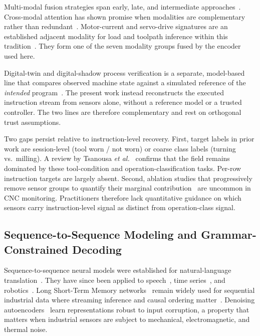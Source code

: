 \documentclass[sensors,article,submit,moreauthors,pdftex]{Definitions/mdpi}
\newcommand{\etal}{\textit{et al.}}
\begin{document}
Multi-modal fusion strategies span early, late, and intermediate approaches~\cite{lahat2015multimodal,ramachandram2017deep}. Cross-modal attention has shown promise when modalities are complementary rather than redundant~\cite{cao2023crossattention,wang2024multisensor}. Motor-current and servo-drive signatures are an established adjacent modality for load and toolpath inference within this tradition~\cite{teti2010advanced,wang2018deep}. They form one of the seven modality groups fused by the encoder used here.

Digital-twin and digital-shadow process verification is a separate, model-based line that compares observed machine state against a simulated reference of the \emph{intended} program~\cite{bergs2021digital}. The present work instead reconstructs the executed instruction stream from sensors alone, without a reference model or a trusted controller. The two lines are therefore complementary and rest on orthogonal trust assumptions.

Two gaps persist relative to instruction-level recovery. First, target labels in prior work are session-level (tool worn / not worn) or coarse class labels (turning vs.\ milling). A review by Tsanousa \etal~\cite{tsanousa2022multisensor} confirms that the field remains dominated by these tool-condition and operation-classification tasks. Per-row instruction targets are largely absent. Second, ablation studies that progressively remove sensor groups to quantify their marginal contribution~\cite{meyes2019ablation,jia2016deep} are uncommon in CNC monitoring. Practitioners therefore lack quantitative guidance on which sensors carry instruction-level signal as distinct from operation-class signal.

\subsection{Sequence-to-Sequence Modeling and Grammar-Constrained Decoding}
\label{sec:related-seq2seq}

Sequence-to-sequence neural models were established for natural-language translation~\cite{sutskever2014sequence,bahdanau2014neural,vaswani2017attention}. They have since been applied to speech~\cite{graves2013speech}, time series~\cite{wen2023transformers}, and robotics~\cite{robotics_s2s}. Long Short-Term Memory networks~\cite{hochreiter1997long} remain widely used for sequential industrial data where streaming inference and causal ordering matter~\cite{malhotra2015lstm}. Denoising autoencoders~\cite{vincent2010stacked} learn representations robust to input corruption, a property that matters when industrial sensors are subject to mechanical, electromagnetic, and thermal noise.
\end{document}
